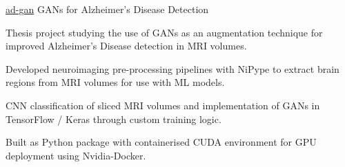 \vspace{-0.1cm}

\begin{cvprojects}


\cvproject
    {\href{https://github.com/kaihulme/ad-gan}{\faGithubSquare\acvHeaderIconSep ad-gan}} %
    {GANs for Alzheimer's Disease Detection} %
    {\begin{cvitems}
        \item Thesis project studying the use of GANs as an augmentation technique for improved Alzheimer’s Disease detection in MRI volumes.
        \item Developed neuroimaging pre-processing pipelines with NiPype to extract brain regions from MRI volumes for use with ML models.
        \item CNN classification of sliced MRI volumes and implementation of GANs in TensorFlow / Keras through custom training logic.
        \item Built as Python package with containerised CUDA environment for GPU deployment using Nvidia-Docker.
      \end{cvitems}
    }
    

\end{cvprojects}
